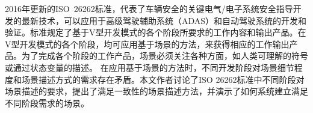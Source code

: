 
2016年更新的ISO~26262标准，代表了车辆安全的关键电气/电子系统安全指导开发的最新技术，可以应用于高级驾驶辅助系统（ADAS）和自动驾驶系统的开发和验证。标准规定了基于V型开发模式的各个阶段所要求的工作内容和输出产品。在V型开发模式的各个阶段，均可应用基于场景的方法，来获得相应的工作输出产品。为了完成各个阶段的工作产品，场景必须关注各种方面，如人类可理解的符号或通过状态变量的描述。
在应用基于场景的方法时，不同开发阶段对场景细节程度和场景描述方式的需求存在矛盾。本文作者讨论了ISO 26262标准中不同阶段对场景描述的要求，提出了满足一致性的场景描述方法，并演示了如何系统建立满足不同阶段需求的场景。
